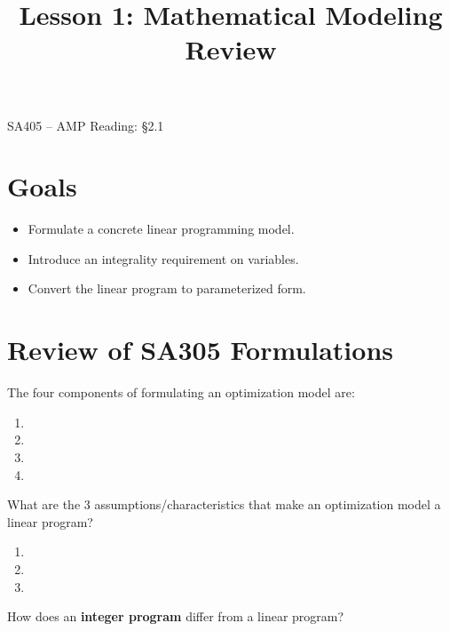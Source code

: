 \documentclass[12pt]{article}
\makeatletter
\theoremstyle{definition}
\newcommand{\graphbox}[5]%
{
\begin{tikzpicture}
     [>=latex,scale=#5]
     
     \draw [->,very thick] (#1, 0) -- (#2, 0) node[right] {$x$};
     \draw [->,very thick] (0, #3) -- (0, #4) node[above] {$y$};
     
     \draw[step=1cm,thick,dotted] (#1,#3) grid (#2,#4);
   \end{tikzpicture}
   }
\renewcommand{\maketitle}{
  \noindent SA405 -- AMP \hfill  Reading: \S 2.1 \\

  \begin{center}\Large{\textbf{\@title}}\end{center}
}
\makeatother
\begin{document}

\title{Lesson 1: Mathematical Modeling Review}


\maketitle

\section{Goals}
\begin{itemize}
\item  Formulate a concrete linear programming model.
\item  Introduce an integrality requirement on variables.
\item  Convert the linear program to parameterized form.
\end{itemize}

\section{Review of SA305 Formulations}

The four components of formulating an optimization model are:

\begin{enumerate}
\item \phantom{a} 
\item \phantom{a} \vspace{0.75in}
\item \phantom{a} \vspace{0.75in}
\item \phantom{a} \vspace{0.75in}
\end{enumerate}

\newpage

What are the 3 assumptions/characteristics that make an optimization model a linear program?
\begin{enumerate}
\item \phantom{a}
\item \phantom{a}
\item \phantom{a}
\end{enumerate}

\vspace{1in}

How does an \textbf{integer program} differ from a linear program?
\end{document}
